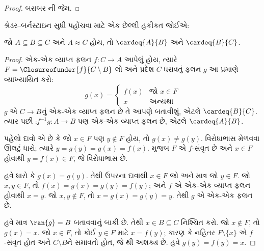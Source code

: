 \begin{proof}
બરાબર ની જેમ.
\end{proof}

શ્રેડર--બર્નસ્ટાઇન સુધી પહોંચવા માટે એક છેલ્લી હકીકત જોઈએ:

\begin{prop}
જો $A \subseteq B \subseteq C$ અને $A \approx C$ હોય, તો
$\cardeq{A}{B}$ અને $\cardeq{B}{C}$.
\end{prop}

\begin{proof}
એક-એક વ્યાપ્ત ફલન $f \colon C \to A$ આપેલું હોય, ત્યારે $F =
\Closureofunder{f}{C \setminus B}$ લો અને પ્રદેશ $C$ ધરાવતું ફલન
$g$ આ પ્રમાણે વ્યાખ્યાયિત કરો:
\[
	g(x) =
	\begin{cases}
			f(x) &\text{જો $x \in F$}\\
			x & \text{અન્યથા}
		\end{cases}
\]
$g$ એ $C \to B$નું એક-એક વ્યાપ્ત ફલન છે તે આપણે બતાવીશું, એટલે
$\cardeq{B}{C}$. ત્યાર પછી $\comp{f^{-1}}{g} \colon A \to B$ પણ
એક-એક વ્યાપ્ત ફલન છે, એટલે $\cardeq{A}{B}$.

પહેલો દાવો એ છે કે જો $x \in F$ પણ $y\notin F$ હોય, તો
$g(x) \neq g(y)$. વિરોધાભાસ મેળવવા ઊલટું ધારો; ત્યારે
$y = g(y) = g(x) = f(x)$.  મુજબ $F$ એ
$f$-સંવૃત છે અને $x \in F$ હોવાથી $y = f(x) \in F$, જે વિરોધાભાસ છે.

હવે ધારો કે $g(x) = g(y)$. તેથી ઉપરના દાવાથી $x \in F$ જો અને માત્ર
જો $y \in F$. જો $x, y \in F$, તો $f(x) = g (x) = g(y) = f(y)$;
અને $f$ એ એક-એક વ્યાપ્ત ફલન હોવાથી $x = y$. જો $x, y \notin F$, તો
$x = g(x) = g(y) = y$. તેથી $g$ એ એક-એક ફલન છે.

હવે માત્ર $\ran{g} = B$ બતાવવાનું બાકી છે. તેથી $x \in B \subseteq C$
નિશ્ચિત કરો. જો $x \notin F$, તો $g(x) = x$. જો $x \in F$, તો કોઈ
$y \in F$ માટે $x = f(y)$; કારણ કે નહિતર $F \setminus \{x\}$ એ
$f$-સંવૃત હોત અને $C\setminus B$ને સમાવતો હોત, જે
થી અશક્ય છે. હવે $g(y) = f(y) = x$.
\end{proof}

